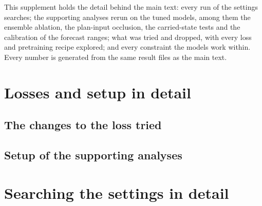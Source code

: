 \renewcommand{\thesection}{S\arabic{section}}
\renewcommand{\thetable}{S\arabic{table}}
\renewcommand{\thefigure}{S\arabic{figure}}

This supplement holds the detail behind the main text: every run of the settings
searches; the supporting analyses rerun on the tuned models, among them the
ensemble ablation, the plan-input occlusion, the carried-state tests and the
calibration of the forecast ranges; what was tried and dropped, with every loss
and pretraining recipe explored; and every constraint the models work within. Every number is generated
from the same result files as the main text.

\section{Losses and setup in detail}
\label{sec:sup-method}

\subsection{The changes to the loss tried}


\subsection{Setup of the supporting analyses}


\section{Searching the settings in detail}
\label{sec:loopdetail}






\twocolumn[\vspace{8pt}]

\FloatBarrier

